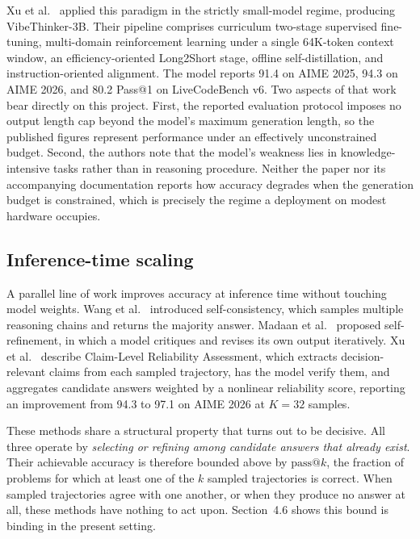 \documentclass[12pt,a4paper,oneside]{report}
\begin{document}
Xu et al.\ \cite{vibethinker} applied this paradigm in the strictly small-model
regime, producing VibeThinker-3B. Their pipeline comprises curriculum two-stage
supervised fine-tuning, multi-domain reinforcement learning under a single
64K-token context window, an efficiency-oriented Long2Short stage, offline
self-distillation, and instruction-oriented alignment. The model reports 91.4 on
AIME 2025, 94.3 on AIME 2026, and 80.2 Pass@1 on LiveCodeBench v6. Two aspects
of that work bear directly on this project. First, the reported evaluation
protocol imposes no output length cap beyond the model's maximum generation
length, so the published figures represent performance under an effectively
unconstrained budget. Second, the authors note that the model's weakness lies in
knowledge-intensive tasks rather than in reasoning procedure. Neither the paper
nor its accompanying documentation reports how accuracy degrades when the
generation budget is constrained, which is precisely the regime a deployment on
modest hardware occupies.

\subsection*{Inference-time scaling}

A parallel line of work improves accuracy at inference time without touching
model weights. Wang et al.\ \cite{selfconsistency} introduced self-consistency,
which samples multiple reasoning chains and returns the majority answer.
Madaan et al.\ \cite{selfrefine} proposed self-refinement, in which a model
critiques and revises its own output iteratively. Xu et al.\ \cite{vibethinker}
describe Claim-Level Reliability Assessment, which extracts decision-relevant
claims from each sampled trajectory, has the model verify them, and aggregates
candidate answers weighted by a nonlinear reliability score, reporting an
improvement from 94.3 to 97.1 on AIME 2026 at $K=32$ samples.

These methods share a structural property that turns out to be decisive. All
three operate by \emph{selecting or refining among candidate answers that
already exist}. Their achievable accuracy is therefore bounded above by
$\text{pass}@k$, the fraction of problems for which at least one of the $k$
sampled trajectories is correct. When sampled trajectories agree with one
another, or when they produce no answer at all, these methods have nothing to
act upon. Section~4.6 shows this bound is binding in the present setting.
\end{document}
